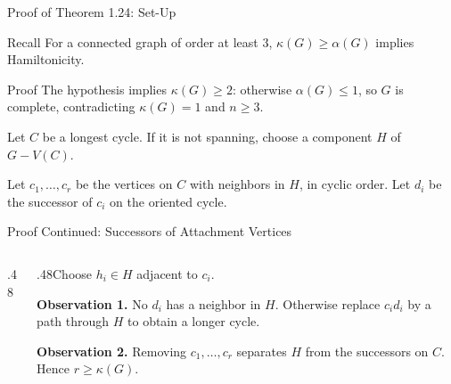 \documentclass[aspectratio=169,11pt]{beamer}
\begin{document}
\begin{frame}{Proof of Theorem 1.24: Set-Up}
\large
\begin{block}{Recall}
For a connected graph of order at least $3$, $\kappa(G)\ge\alpha(G)$ implies Hamiltonicity.
\end{block}
\begin{block}{Proof}
\normalsize The hypothesis implies $\kappa(G)\ge2$: otherwise $\alpha(G)\le1$, so $G$ is complete, contradicting $\kappa(G)=1$ and $n\ge3$.\par\medskip Let $C$ be a longest cycle. If it is not spanning, choose a component $H$ of $G-V(C)$.\par\medskip Let $c_1,\ldots,c_r$ be the vertices on $C$ with neighbors in $H$, in cyclic order. Let $d_i$ be the successor of $c_i$ on the oriented cycle.
\end{block}

\end{frame}

\begin{frame}{Proof Continued: Successors of Attachment Vertices}
\large
\begin{columns}[c,onlytextwidth]\begin{column}{.48\textwidth}\begin{center}\end{center}\end{column}\begin{column}{.48\textwidth}Choose $h_i\in H$ adjacent to $c_i$.\par\medskip\textbf{Observation 1.} No $d_i$ has a neighbor in $H$. Otherwise replace $c_id_i$ by a path through $H$ to obtain a longer cycle.\par\medskip\textbf{Observation 2.} Removing $c_1,\ldots,c_r$ separates $H$ from the successors on $C$. Hence $r\ge\kappa(G)$.\end{column}\end{columns}
\end{frame}
\end{document}
